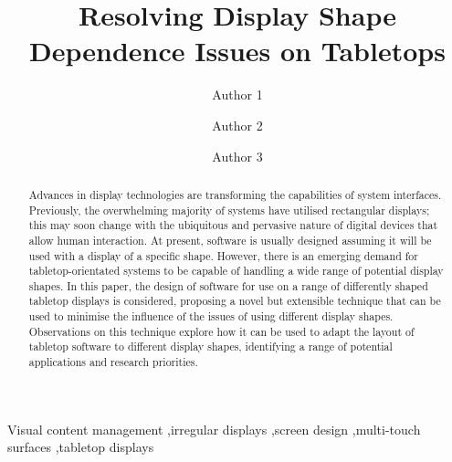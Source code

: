 \documentclass[review,5p,times,twocolumn]{elsarticle}
\begin{document}
\begin{frontmatter}



\title{Resolving Display Shape Dependence Issues on Tabletops}


\author[anon1]{Author 1}
\author[anon2]{Author 2}
\author[anon3]{Author 3}


\address[anon1]{Address 1}
\address[anon2]{Address 2}
\address[anon3]{Address 3}


\begin{abstract}
Advances in display technologies are transforming the capabilities of system interfaces.
Previously, the overwhelming majority of systems have utilised rectangular
displays; this may soon change with the ubiquitous and pervasive nature of digital devices that allow human interaction.
At present, software is usually designed assuming it will be used with a display of a specific shape.
However, there is an emerging demand for tabletop-orientated systems
to be capable of handling a wide range of potential display shapes.
In this paper, the design of software for use on a range of
differently shaped tabletop displays is considered, proposing a novel
but extensible technique that can be used to minimise the influence of
the issues of using different display shapes.
Observations on this technique explore how it can be used to adapt the
layout of tabletop software to different display shapes, identifying a
range of potential applications and research priorities.
\end{abstract}


\begin{keyword}
Visual content management \sep irregular displays \sep screen design \sep multi-touch surfaces \sep tabletop displays
\end{keyword}


\end{frontmatter}
\end{document}
